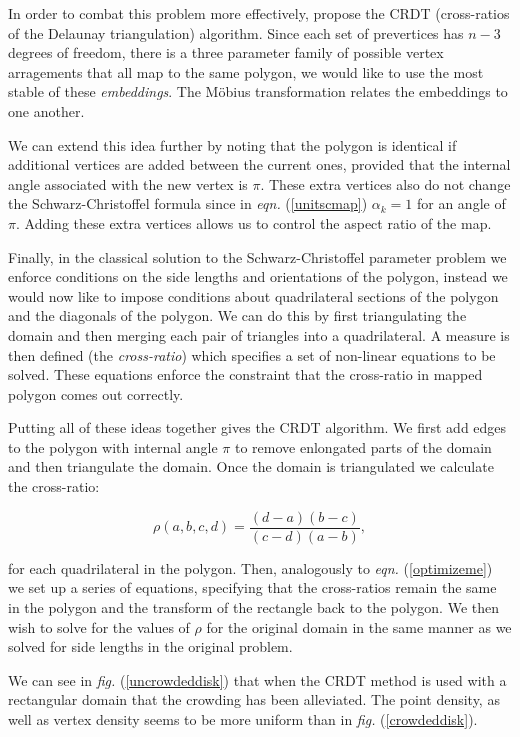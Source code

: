 \documentclass[a4paper,10pt]{amsart}
\newcommand{\sch}{Schwarz-Christoffel }
\newcommand{\fig}[1]{\emph{fig.} (\ref{#1})}
\newcommand{\eqn}[1]{\emph{eqn.} (\ref{#1})}
\begin{document}
In order to combat this problem more effectively, \cite{vavasis96} propose the CRDT (cross-ratios of the Delaunay triangulation) algorithm. Since each set of prevertices has $n-3$ degrees of freedom, there is a three parameter family of possible vertex arragements that all map to the same polygon, we would like to use the most stable of these \emph{embeddings}. The M\"{o}bius transformation relates the embeddings to one another.

We can extend this idea further by noting that the polygon is identical if additional vertices are added between the current ones, provided that the internal angle associated with the new vertex is $\pi$. These extra vertices also do not change the \sch formula since in \eqn{unitscmap} $\alpha_k=1$ for an angle of $\pi$. Adding these extra vertices allows us to control the aspect ratio of the map.

Finally, in the classical solution to the \sch parameter problem we enforce conditions on the side lengths and orientations of the polygon, instead we would now like to impose conditions about quadrilateral sections of the polygon and the diagonals of the polygon. We can do this by first triangulating the domain and then merging each pair of triangles into a quadrilateral. A measure is then defined (the \emph{cross-ratio}) which specifies a set of non-linear equations to be solved. These equations enforce the constraint that the cross-ratio in mapped polygon comes out correctly. 

Putting all of these ideas together gives the CRDT algorithm. We first add edges to the polygon with internal angle $\pi$ to remove enlongated parts of the domain and then triangulate the domain. Once the domain is triangulated we calculate the cross-ratio:

\begin{equation}
\rho(a,b,c,d) = \frac{(d-a)(b-c)}{(c-d)(a-b)},
\end{equation}

for each quadrilateral in the polygon. Then, analogously to \eqn{optimizeme} we set up a series of equations, specifying that the cross-ratios remain the same in the polygon and the transform of the rectangle back to the polygon. We then wish to solve for the values of $\rho$ for the original domain in the same manner as we solved for side lengths in the original problem. 

We can see in \fig{uncrowdeddisk} that when the CRDT method is used with a rectangular domain that the crowding has been alleviated. The point density, as well as vertex density seems to be more uniform than in \fig{crowdeddisk}.
\end{document}
